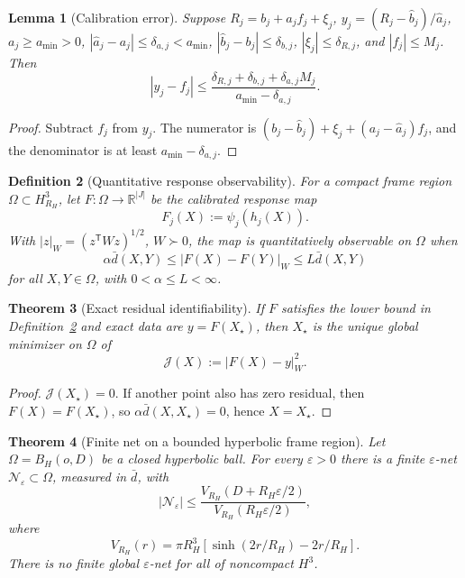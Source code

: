 \documentclass[11pt]{article}
\newtheorem{theorem}{Theorem}[section]
\newtheorem{lemma}[theorem]{Lemma}
\newtheorem{definition}[theorem]{Definition}
\begin{document}
\begin{lemma}[Calibration error]\label{lem:h3-localization-calibration-error}
Suppose \(R_j=b_j+a_jf_j+\xi_j\), \(y_j=(R_j-\widehat b_j)/\widehat a_j\),
\(a_j\geq a_{\min}>0\), \(|\widehat a_j-a_j|\leq\delta_{a,j}<a_{\min}\),
\(|\widehat b_j-b_j|\leq\delta_{b,j}\), \(|\xi_j|\leq\delta_{R,j}\), and
\(|f_j|\leq M_j\). Then
\[
|y_j-f_j|
\leq
\frac{\delta_{R,j}+\delta_{b,j}+\delta_{a,j}M_j}
{a_{\min}-\delta_{a,j}}.
\]
\end{lemma}

\begin{proof}
Subtract \(f_j\) from \(y_j\). The numerator is
\((b_j-\widehat b_j)+\xi_j+(a_j-\widehat a_j)f_j\), and the denominator is at
least \(a_{\min}-\delta_{a,j}\).
\end{proof}

\begin{definition}[Quantitative response observability]\label{def:h3-response-observability}
For a compact frame region \(\Omega\subset H^3_{R_H}\), let
\(F:\Omega\to\mathbb R^{|J|}\) be the calibrated response map
\[
F_j(X):=\psi_j(h_j(X)).
\]
With \(|z|_W=(z^{\mathsf T}Wz)^{1/2}\), \(W\succ0\), the map is
quantitatively observable on \(\Omega\) when
\[
\alpha\bar d(X,Y)\leq |F(X)-F(Y)|_W\leq L\bar d(X,Y)
\]
for all \(X,Y\in\Omega\), with \(0<\alpha\leq L<\infty\).
\end{definition}

\begin{theorem}[Exact residual identifiability]\label{thm:h3-exact-residual-identifiability}
If \(F\) satisfies the lower bound in Definition~\ref{def:h3-response-observability}
and exact data are \(y=F(X_\star)\), then \(X_\star\) is the unique global
minimizer on \(\Omega\) of
\[
\mathcal J(X):=|F(X)-y|_W^2.
\]
\end{theorem}

\begin{proof}
\(\mathcal J(X_\star)=0\). If another point also has zero residual, then
\(F(X)=F(X_\star)\), so \(\alpha\bar d(X,X_\star)=0\), hence \(X=X_\star\).
\end{proof}

\begin{theorem}[Finite net on a bounded hyperbolic frame region]
\label{thm:h3-finite-localization-net}
Let \(\Omega=B_H(o,D)\) be a closed hyperbolic ball. For every
\(\varepsilon>0\) there is a finite \(\varepsilon\)-net
\(\mathcal N_\varepsilon\subset\Omega\), measured in \(\bar d\), with
\[
|\mathcal N_\varepsilon|
\leq
\frac{V_{R_H}(D+R_H\varepsilon/2)}{V_{R_H}(R_H\varepsilon/2)},
\]
where
\[
V_{R_H}(r)=\pi R_H^3\left[\sinh(2r/R_H)-2r/R_H\right].
\]
There is no finite global \(\varepsilon\)-net for all of noncompact \(H^3\).
\end{theorem}
\end{document}
